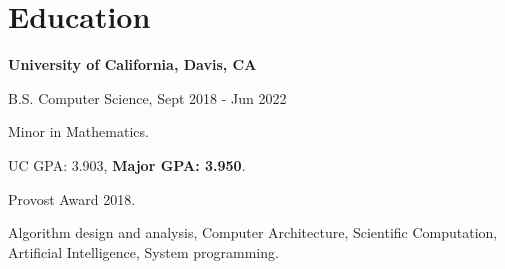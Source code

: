 \section{\sc Education}

{\bf University of California, Davis, CA}\\
\vspace*{-.1in}
\begin{list1}
\item[] B.S. Computer Science, Sept 2018 - Jun 2022
\begin{list2}
\vspace*{.05in}
\item Minor in Mathematics.
\item UC GPA: 3.903, \textbf{Major GPA: 3.950}.
\item Provost Award 2018.
\item Algorithm design and analysis, Computer Architecture, Scientific Computation, Artificial Intelligence, System programming. 
\end{list2}
\end{list1}


\endinput